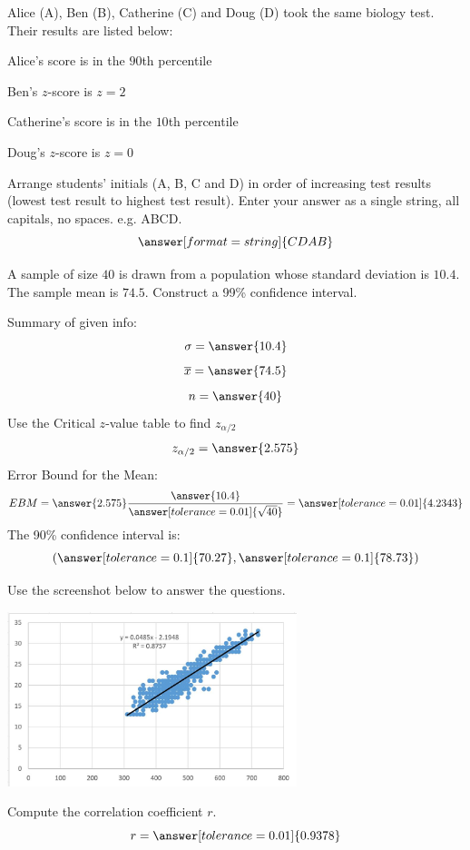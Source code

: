 \documentclass{ximera}
\begin{document}
\begin{problem}\label{prob:140finalprob3}
Alice (A), Ben (B), Catherine (C) and Doug (D) took the same biology test.  Their results are listed below: 

Alice's score is in the $90$th percentile 

Ben's $z$-score is $z = 2$ 

Catherine's score is in the $10$th percentile 

Doug's $z$-score is $z = 0$

Arrange students’ initials (A, B, C and D) in order of increasing test results (lowest test result to highest test result).  Enter your answer as a single string, all capitals, no spaces.  e.g. ABCD.
$$\answer[format=string]{CDAB}$$
\end{problem}

\begin{problem}\label{prob:140finalprob4}
A sample of size $40$ is drawn from a population whose standard deviation is $10.4$.  The sample mean is $74.5$.  Construct a 99\% confidence interval.

Summary of given info:
$$\sigma=\answer{10.4}$$
$$\overline{x}=\answer{74.5}$$
$$n=\answer{40}$$
Use the Critical $z$-value table to find $z_{\alpha/2}$
$$z_{\alpha/2}=\answer{2.575}$$
Error Bound for the Mean:
$$EBM=\answer{2.575}\frac{\answer{10.4}}{\answer[tolerance=0.01]{\sqrt{40}}}=\answer[tolerance=0.01]{4.2343}$$
The 90\% confidence interval is:
$$(\answer[tolerance=0.1]{70.27},\answer[tolerance=0.1]{78.73})$$
\end{problem}

\begin{problem}\label{prob:140finalprob5}
Use the screenshot below to answer the questions.  

\begin{center}
\includegraphics[height=2in]{140finalpic1.jpg}
\end{center}

Compute the correlation coefficient $r$.
 $$r=\answer[tolerance=0.01]{0.9378}$$
\end{problem}
\end{document}
